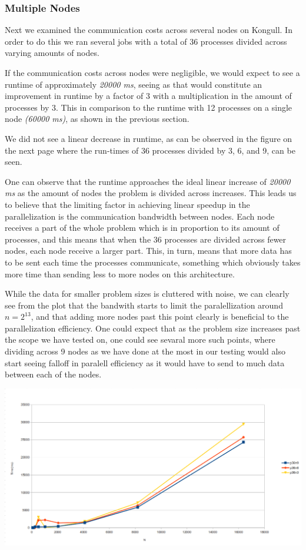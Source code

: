 \documentclass[fontsize=11pt,paper=a4,titlepage]{article}
\begin{document}
\subsubsection{Multiple Nodes}

Next we examined the communication costs across several nodes on Kongull. In
order to do this we ran several jobs with a total of 36 processes divided across
varying amounts of nodes.

If the communication costs across nodes were negligible, we would expect to see
a runtime of approximately \emph{20000 ms}, seeing as that would constitute an
improvement in runtime by a factor of 3 with a multiplication in the amount of
processes by 3. This in comparison to the runtime with 12 processes on a single
node \emph{(60000 ms)}, as shown in the previous section.

We did not see a linear decrease in runtime, as can be observed in the figure
on the next page where the run-times of 36 processes divided by 3, 6, and 9, can
be seen.

One can observe that the runtime approaches the ideal linear increase of
\emph{20000 ms} as the amount of nodes the problem is divided across increases.
This leads us to believe that the limiting factor in achieving linear speedup in
the parallelization is the communication bandwidth between nodes. Each node
receives a part of the whole problem which is in proportion to its amount of
processes, and this means that when the 36 processes are divided across fewer
nodes, each node receive a larger part. This, in turn, means that more data has
to be sent each time the processes communicate, something which obviously takes
more time than sending less to more nodes on this architecture.

While the data for smaller problem sizes is cluttered with noise, we can clearly see from the plot that the bandwith starts to limit the paralellization around $n = 2^{13}$, and that adding more nodes past this point clearly is beneficial to the parallelization efficiency. One could expect that as the problem size increases past the scope we have tested on, one could see sevaral more such points, where dividing across 9 nodes as we have done at the most in our testing would also start seeing falloff in paralell efficiency as it would have to send to much data between each of the nodes.

\hspace*{-1.5cm}\includegraphics[scale=0.6]{pics/p36nX.png}
\end{document}
